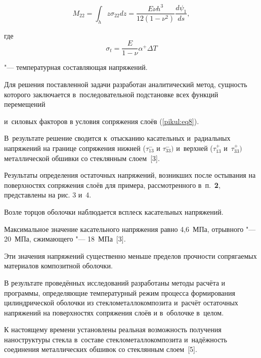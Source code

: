 \[

M_{22} =\int_h {z\sigma _{22} dz} =\frac{E\nu h^3}{12\left( {1-\nu ^2} \right)}\frac{d\psi _1 }{ds},

\]

где $$\sigma _t =\frac E{1-\nu } \alpha ^{+}\Delta T$$

 "--- температурная составляющая напряжений.



Для решения поставленной задачи разработан аналитический метод, сущность  которого заключается в~последовательной подстановке всех функций перемещений 

и~силовых факторов в условия сопряжения слоёв (\ref{pikul:eq8}). 

В~результате решение сводится к~отысканию касательных и~радиальных напряжений на границе сопряжения нижней ($\tau _{13}^{-} $ и $\tau _{33}^{-} )$ и~верхней ($\tau  _{13}^{+} $ и~$\tau _{33}^{+} )$ металлической обшивки со стеклянным слоем~[3].



Результаты определения остаточных напряжений, возникших после остывания на поверхностях сопряжения слоёв для примера, рассмотренного в~п.~{\bf 2}, представлены на рис. 3 и~4. 

Возле торцов оболочки наблюдается всплеск касательных напряжений. 

Максимальное значение касательного напряжения равно 4,6~МПа, отрывного "--- 20~МПа, сжимающего "--- 18~МПа~[3]. 

Эти значения напряжений существенно меньше пределов прочности сопрягаемых материалов композитной оболочки.




















В результате проведённых исследований разработаны методы расчёта и программы, определяющие температурный режим процесса формирования цилиндрической оболочки из стеклометаллокомпозита и~расчёт остаточных напряжений на поверхностях сопряжения слоёв и в~оболочке в~целом.



К настоящему времени установлены реальная возможность получения наноструктуры стекла в~составе стеклометаллокомпозита и~надёжность соединения металлических обшивок со стеклянным слоем~[5]. 

